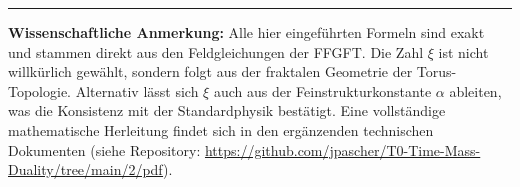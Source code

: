 \vspace{1cm}
\hrule
\vspace{0.5cm}
\noindent\textbf{Wissenschaftliche Anmerkung:} Alle hier eingeführten Formeln sind exakt und stammen direkt aus den Feldgleichungen der FFGFT. Die Zahl $\xi$ ist nicht willkürlich gewählt, sondern folgt aus der fraktalen Geometrie der Torus-Topologie. Alternativ lässt sich $\xi$ auch aus der Feinstrukturkonstante $\alpha$ ableiten, was die Konsistenz mit der Standardphysik bestätigt. Eine vollständige mathematische Herleitung findet sich in den ergänzenden technischen Dokumenten (siehe Repository: \url{https://github.com/jpascher/T0-Time-Mass-Duality/tree/main/2/pdf}).



